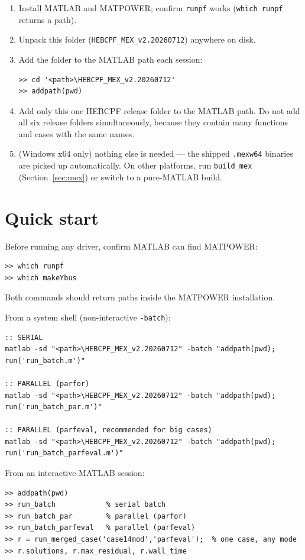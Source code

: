 \documentclass[11pt,a4paper]{article}
\newcommand{\code}[1]{\texttt{#1}}
\begin{document}
\begin{enumerate}[leftmargin=1.6em]
  \item Install MATLAB and MATPOWER; confirm \code{runpf} works
        (\code{which runpf} returns a path).
  \item Unpack this folder (\code{HEBCPF_MEX_v2.20260712}) anywhere on disk.
  \item Add the folder to the MATLAB path each session:
\begin{lstlisting}
>> cd '<path>\HEBCPF_MEX_v2.20260712'
>> addpath(pwd)
\end{lstlisting}
  \item Add only this one HEBCPF release folder to the MATLAB path. Do not add all six
        release folders simultaneously, because they contain many functions and cases with
        the same names.
  \item (Windows x64 only) nothing else is needed --- the shipped \code{.mexw64} binaries
        are picked up automatically. On other platforms, run \code{build_mex}
        (Section~\ref{sec:mex}) or switch to a pure-MATLAB build.
\end{enumerate}

\section{Quick start}

Before running any driver, confirm MATLAB can find MATPOWER:
\begin{lstlisting}[style=mat]
>> which runpf
>> which makeYbus
\end{lstlisting}
Both commands should return paths inside the MATPOWER installation.

From a system shell (non-interactive \code{-batch}):
\begin{lstlisting}[style=sh]
:: SERIAL
matlab -sd "<path>\HEBCPF_MEX_v2.20260712" -batch "addpath(pwd); run('run_batch.m')"

:: PARALLEL (parfor)
matlab -sd "<path>\HEBCPF_MEX_v2.20260712" -batch "addpath(pwd); run('run_batch_par.m')"

:: PARALLEL (parfeval, recommended for big cases)
matlab -sd "<path>\HEBCPF_MEX_v2.20260712" -batch "addpath(pwd); run('run_batch_parfeval.m')"
\end{lstlisting}

From an interactive MATLAB session:
\begin{lstlisting}[style=mat]
>> addpath(pwd)
>> run_batch            % serial batch
>> run_batch_par        % parallel (parfor)
>> run_batch_parfeval   % parallel (parfeval)
>> r = run_merged_case('case14mod','parfeval');  % one case, any mode
>> r.solutions, r.max_residual, r.wall_time
\end{lstlisting}
\end{document}
